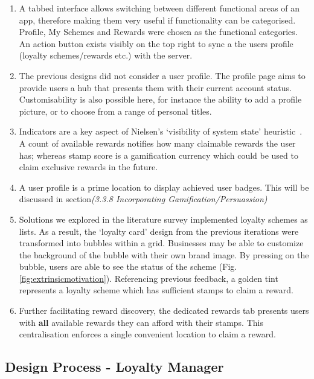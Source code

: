 \begin{enumerate}
  \item A tabbed interface allows switching between different functional areas of an app, therefore making them very useful if functionality can be categorised. Profile, My Schemes and Rewards were chosen as the functional categories. An action button exists visibly on the top right to sync a the users profile (loyalty schemes/rewards etc.) with the server.
  \item The previous designs did not consider a user profile. The profile page aims to provide users a hub that presents them with their current account status. Customisability is also possible here, for instance the ability to add a profile picture, or to choose from a range of personal titles.
  \item Indicators are a key aspect of Nielsen's `visibility of system state' heuristic~\cite{jakob}. A count of available rewards notifies how many claimable rewards the user has; whereas stamp score is a gamification currency which could be used to claim exclusive rewards in the future. 
  \item A user profile is a prime location to display achieved user badges. This will be discussed in section\textit{(3.3.8 Incorporating Gamification/Persuassion)}
  \item Solutions we explored in the literature survey implemented loyalty schemes as lists. As a result, the `loyalty card' design from the previous iterations were transformed into bubbles within a grid. Businesses may be able to customize the background of the bubble with their own brand image. By pressing on the bubble, users are able to see the status of the scheme (Fig. \ref{fig:extrinsicmotivation}). Referencing previous feedback, a golden tint represents a loyalty scheme which has sufficient stamps to claim a reward.
  \item Further facilitating reward discovery, the dedicated rewards tab presents users with \textbf{all} available rewards they can afford with their stamps. This centralisation enforces a single convenient location to claim a reward. 
\end{enumerate}

\newpage
\subsection{Design Process - Loyalty Manager}
